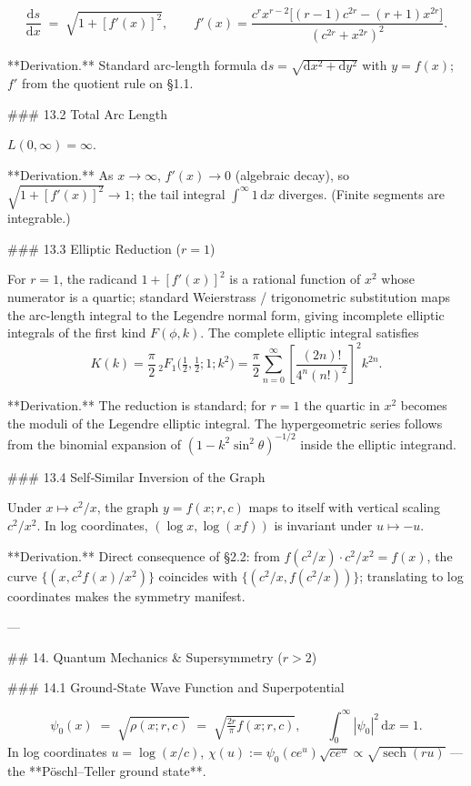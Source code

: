 $$
\frac{\mathrm ds}{\mathrm dx} \;=\; \sqrt{1+[f'(x)]^{2}},\qquad f'(x) = \frac{c^{r}x^{r-2}\bigl[(r-1)c^{2r}-(r+1)x^{2r}\bigr]}{(c^{2r}+x^{2r})^{2}}.
$$

**Derivation.** Standard arc-length formula $\mathrm ds = \sqrt{\mathrm dx^{2} + \mathrm dy^{2}}$ with $y = f(x)$; $f'$ from the quotient rule on §1.1.

### 13.2 Total Arc Length

$L(0,\infty) = \infty$.

**Derivation.** As $x\to\infty$, $f'(x)\to 0$ (algebraic decay), so $\sqrt{1+[f'(x)]^{2}}\to 1$; the tail integral $\int^{\infty}1\,\mathrm dx$ diverges. (Finite segments are integrable.)

### 13.3 Elliptic Reduction ($r=1$)

For $r=1$, the radicand $1+[f'(x)]^{2}$ is a rational function of $x^{2}$ whose numerator is a quartic; standard Weierstrass / trigonometric substitution maps the arc-length integral to the Legendre normal form, giving incomplete elliptic integrals of the first kind $F(\phi,k)$. The complete elliptic integral satisfies
$$
K(k) = \frac{\pi}{2}\,{}_{2}F_{1}\!\bigl(\tfrac{1}{2},\tfrac{1}{2};1;k^{2}\bigr) = \frac{\pi}{2}\sum_{n=0}^{\infty}\left[\frac{(2n)!}{4^{n}(n!)^{2}}\right]^{2}k^{2n}.
$$

**Derivation.** The reduction is standard; for $r=1$ the quartic in $x^{2}$ becomes the moduli of the Legendre elliptic integral. The hypergeometric series follows from the binomial expansion of $(1-k^{2}\sin^{2}\theta)^{-1/2}$ inside the elliptic integrand.

### 13.4 Self‑Similar Inversion of the Graph

Under $x\mapsto c^{2}/x$, the graph $y = f(x;r,c)$ maps to itself with vertical scaling $c^{2}/x^{2}$. In log coordinates, $(\log x, \log(xf))$ is invariant under $u\mapsto -u$.

**Derivation.** Direct consequence of §2.2: from $f(c^{2}/x)\cdot c^{2}/x^{2} = f(x)$, the curve $\{(x, c^{2}f(x)/x^{2})\}$ coincides with $\{(c^{2}/x, f(c^{2}/x))\}$; translating to log coordinates makes the symmetry manifest.

---

## 14. Quantum Mechanics & Supersymmetry ($r>2$)

### 14.1 Ground‑State Wave Function and Superpotential

$$
\psi_{0}(x) \;=\; \sqrt{\rho(x;r,c)} \;=\; \sqrt{\tfrac{2r}{\pi}f(x;r,c)},\qquad \int_{0}^{\infty}|\psi_{0}|^{2}\,\mathrm dx = 1.
$$
In log coordinates $u = \log(x/c)$, $\chi(u) := \psi_{0}(ce^{u})\sqrt{ce^{u}} \propto \sqrt{\operatorname{sech}(ru)}$ — the **Pöschl–Teller ground state**.

